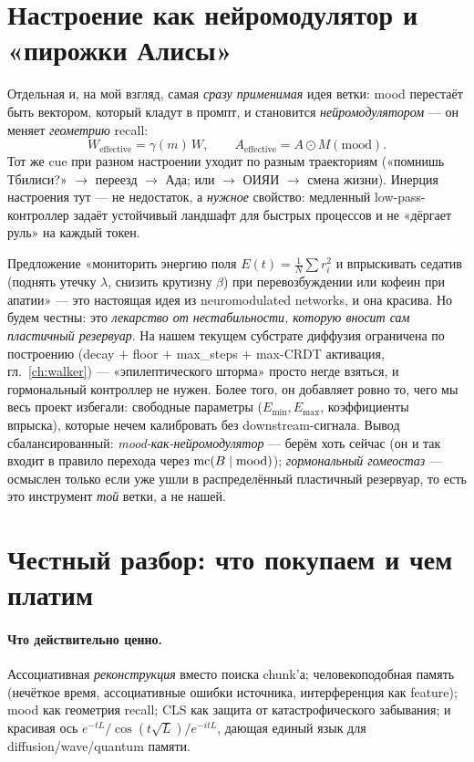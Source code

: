\section{Настроение как нейромодулятор и «пирожки Алисы»}

Отдельная и, на мой взгляд, самая \emph{сразу применимая} идея ветки: mood перестаёт быть
вектором, который кладут в промпт, и становится \emph{нейромодулятором} — он меняет
\emph{геометрию} recall:
\[
W_{\text{effective}} = \gamma(m)\,W,\qquad
A_{\text{effective}} = A\odot M(\mathrm{mood}).
\]
Тот же cue при разном настроении уходит по разным траекториям («помнишь Тбилиси?» $\to$ переезд
$\to$ Ада; или $\to$ ОИЯИ $\to$ смена жизни). Инерция настроения тут — не недостаток, а
\emph{нужное} свойство: медленный low-pass-контроллер задаёт устойчивый ландшафт для быстрых
процессов и не «дёргает руль» на каждый токен.

\begin{intuition}
Предложение «мониторить энергию поля $E(t)=\frac1N\sum r_i^2$ и впрыскивать седатив (поднять
утечку $\lambda$, снизить крутизну $\beta$) при перевозбуждении или кофеин при апатии» — это
настоящая идея из neuromodulated networks, и она красива. Но будем честны: это \emph{лекарство
от нестабильности, которую вносит сам пластичный резервуар}. На нашем текущем субстрате
диффузия ограничена по построению (decay $+$ floor $+$ max\_steps $+$ max-CRDT активация,
гл.~\ref{ch:walker}) — «эпилептического шторма» просто негде взяться, и гормональный
контроллер не нужен. Более того, он добавляет ровно то, чего мы весь проект избегали:
свободные параметры ($E_{\min},E_{\max}$, коэффициенты впрыска), которые нечем калибровать без
downstream-сигнала. Вывод сбалансированный: \emph{mood-как-нейромодулятор} — берём хоть сейчас
(он и так входит в правило перехода через $\mathrm{mc}(B\mid\mathrm{mood})$); \emph{гормональный
гомеостаз} — осмыслен только если уже ушли в распределённый пластичный резервуар, то есть это
инструмент \emph{той} ветки, а не нашей.
\end{intuition}

\section{Честный разбор: что покупаем и чем платим}

\paragraph{Что действительно ценно.} Ассоциативная \emph{реконструкция} вместо поиска chunk'а;
человекоподобная память (нечёткое время, ассоциативные ошибки источника, интерференция как
feature); mood как геометрия recall; CLS как защита от катастрофического забывания; и красивая
ось $e^{-tL}/\cos(t\sqrt L)/e^{-itL}$, дающая единый язык для diffusion/wave/quantum памяти.


